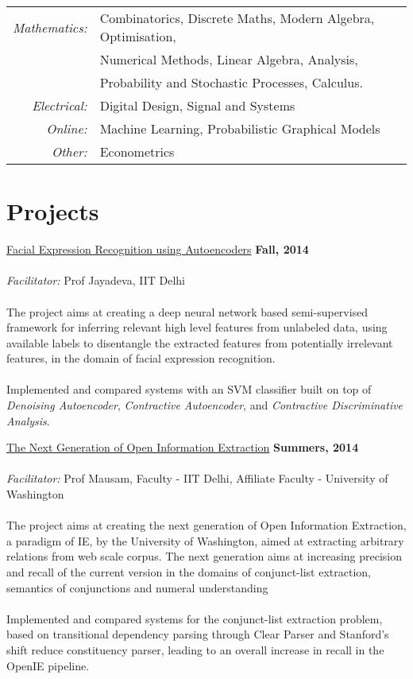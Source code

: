\documentclass[margin,line]{res}
\begin{document}
\begin{resume}
\begin{tabular}{rlp{5cm}}
\em{Mathematics:} & Combinatorics, Discrete Maths, Modern Algebra, Optimisation,
\\&  Numerical Methods, Linear Algebra, Analysis, 
\\ & Probability and Stochastic Processes, Calculus.\\

\em{Electrical:} & Digital Design, Signal and Systems\\

\em{Online:} & Machine Learning, Probabilistic Graphical Models\\

\em{Other:} &Econometrics\\
\end{tabular}

\section{\sc Projects}

\underline{\sc Facial Expression Recognition using Autoencoders} \hfill {\bf Fall, 2014}\\\\
{\em Facilitator:} Prof Jayadeva, IIT Delhi \\\\
The project aims at creating a deep neural network based semi-supervised framework for inferring relevant high level features from unlabeled data, using available labels to disentangle the extracted features from potentially irrelevant features, in the domain of facial expression recognition.\\\\
Implemented and compared systems with an SVM classifier built on top of {\em Denoising Autoencoder}, {\em Contractive Autoencoder}, and {\em Contractive Discriminative Analysis}.

\underline{\sc The Next Generation of Open Information Extraction} \hfill {\bf Summers, 2014}\\\\
{\em Facilitator:} Prof Mausam, Faculty - IIT Delhi, Affiliate Faculty - University of Washington \\\\
The project aims at creating the next generation of Open Information Extraction, a paradigm of IE, by the University of Washington, aimed at extracting arbitrary relations from web scale corpus. The next generation aims at increasing precision and recall of the current version in the domains of conjunct-list extraction, semantics of conjunctions and numeral understanding \\\\
Implemented and compared systems  for the conjunct-list extraction problem, based on transitional dependency parsing through Clear Parser and Stanford's shift reduce constituency parser, leading to an overall increase in recall in the OpenIE pipeline.\\


\end{resume}
\end{document}
